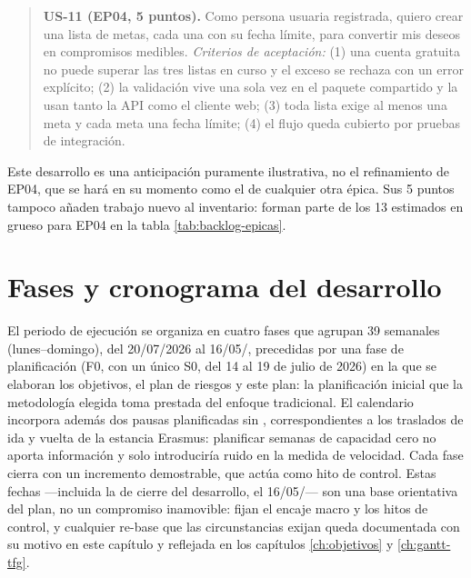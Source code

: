 \begin{quote}
  \textbf{US-11 (EP04, 5 puntos).}
  Como persona usuaria registrada, quiero crear una lista de metas, cada una con su fecha límite, para convertir mis deseos en compromisos medibles.
  \emph{Criterios de aceptación:} (1) una cuenta gratuita no puede superar las tres listas en curso y el exceso se rechaza con un error explícito; (2) la validación vive una sola vez en el paquete compartido y la usan tanto la \ac{API} como el cliente web; (3) toda lista exige al menos una meta y cada meta una fecha límite; (4) el flujo queda cubierto por pruebas de integración.
\end{quote}

Este desarrollo es una anticipación puramente ilustrativa, no el refinamiento de EP04, que se hará en su momento como el de cualquier otra épica.
Sus 5 puntos tampoco añaden trabajo nuevo al inventario: forman parte de los 13 estimados en grueso para EP04 en la tabla \ref{tab:backlog-epicas}.

\section{Fases y cronograma del desarrollo}
\label{sec:fases}

El periodo de ejecución se organiza en cuatro fases que agrupan 39  semanales (lunes--domingo), del 20/07/2026 al 16/05/\thesisYear, precedidas por una fase de planificación (F0, con un único  S0, del 14 al 19 de julio de 2026) en la que se elaboran los objetivos, el plan de riesgos y este plan: la planificación inicial que la metodología elegida toma prestada del enfoque tradicional.
El calendario incorpora además dos pausas planificadas sin , correspondientes a los traslados de ida y vuelta de la estancia Erasmus: planificar semanas de capacidad cero no aporta información y solo introduciría ruido en la medida de velocidad.
Cada fase cierra con un incremento demostrable, que actúa como hito de control.
Estas fechas —incluida la de cierre del desarrollo, el 16/05/\thesisYear— son una base orientativa del plan, no un compromiso inamovible: fijan el encaje macro y los hitos de control, y cualquier re-base que las circunstancias exijan queda documentada con su motivo en este capítulo y reflejada en los capítulos \ref{ch:objetivos} y \ref{ch:gantt-tfg}.

